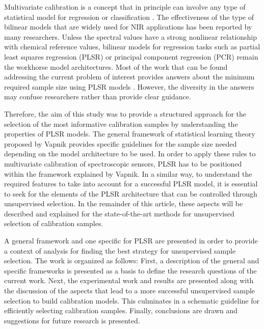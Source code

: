 \documentclass[preprint,12pt]{elsarticle}
\begin{document}
Multivariate calibration is a concept that in principle can involve any type of statistical model for regression or classification \cite{Saeys2019}. The effectiveness of the type of bilinear models that are widely used for NIR applications has been reported by many researchers. Unless the spectral values have a strong nonlinear relationship with chemical reference values, bilinear models for regression tasks such as partial least squares regression (PLSR) or principal component regression (PCR) remain the workhorse model architectures\cite{FonsecaDiaz2020}. Most of the work that can be found addressing the current problem of interest provides answers about the minimum required sample size using PLSR models \cite{Naes1990, Au2020, Shetty2012a, Rodionova2008}. However, the diversity in the answers may confuse researchers rather than provide clear guidance. 

Therefore, the aim of this study was to provide a structured approach for the selection of the most informative calibration samples by understanding the properties of PLSR models. The general framework of statistical learning theory proposed by Vapnik provides specific guidelines for the sample size needed depending on the model architecture to be used\cite{Vapnik2019, Vapnik2000}. In order to apply these rules to multivariate calibration of spectroscopic sensors, PLSR has to be positioned within the framework explained by Vapnik. In a similar way, to understand the required features to take into account for a successful PLSR model, it is essential to seek for the elements of the PLSR architecture that can be controlled through unsupervised selection. In the remainder of this article, these aspects will be described and explained for the state-of-the-art methods for unsupervised selection of calibration samples.

A general framework and one specific for PLSR are presented in order to provide a context of analysis for finding the best strategy for unsupervised sample selection. The work is organized as follows: First, a description of the general and specific frameworks is presented as a basis to define the research questions of the current work. Next, the experimental work and results are presented along with the discussion of the aspects that lead to a more successful unsupervised sample selection to build calibration models. This culminates in a schematic guideline for efficiently selecting calibration samples. Finally, conclusions are drawn and suggestions for future research is presented.
\end{document}
